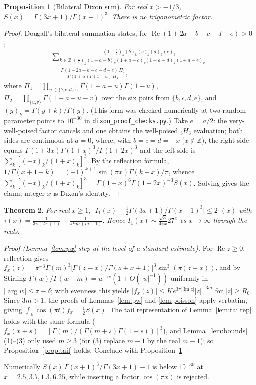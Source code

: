 \documentclass[11pt]{amsart}
\newtheorem{theorem}{Theorem}[section]
\newtheorem{proposition}[theorem]{Proposition}
\theoremstyle{remark}
\newcommand{\R}{\mathbb{R}}
\newcommand{\Z}{\mathbb{Z}}
\begin{document}
\begin{proposition}[Bilateral Dixon sum]\label{prop:bilateral}
For real $x>-1/3$, $S(x)=\Gamma(3x+1)/\Gamma(x+1)^3$. There is no trigonometric factor.
\end{proposition}
\begin{proof}
Dougall's bilateral summation \cite{Dougall,Bailey,AAR} states, for $\operatorname{Re}(1+2a-b-c-d-e)>0$,
\begin{multline*}
\sum_{k\in\Z}\frac{(1+\frac a2)_k(b)_k(c)_k(d)_k(e)_k}{(\frac a2)_k(1+a-b)_k(1+a-c)_k(1+a-d)_k(1+a-e)_k}\\
=\frac{\Gamma(1+2a-b-c-d-e)\,\Pi_1}{\Gamma(1+a)\Gamma(1-a)\,\Pi_2},
\end{multline*}
where $\Pi_1=\prod_{u\in\{b,c,d,e\}}\Gamma(1+a-u)\Gamma(1-u)$, $\Pi_2=\prod_{\{u,v\}}\Gamma(1+a-u-v)$ over the six pairs from $\{b,c,d,e\}$, and $(y)_k=\Gamma(y+k)/\Gamma(y)$. (This form was checked numerically at two random parameter
points to $10^{-30}$ in \texttt{dixon\_proof\_checks.py}.) Take $e=a/2$: the very-well-poised factor cancels and one obtains the
well-poised ${}_3H_3$ evaluation; both sides are continuous at $a=0$, where, with $b=c=d=-x$ ($x\notin\Z$), the right side equals
$\Gamma(1+3x)\Gamma(1+x)^3/\Gamma(1+2x)^3$ and the left side is $\sum_k[(-x)_k/(1+x)_k]^3$.
By the reflection formula, $1/\Gamma(x+1-k)=(-1)^{k+1}\sin(\pi x)\Gamma(k-x)/\pi$, whence
$\sum_k[(-x)_k/(1+x)_k]^3=\Gamma(1+x)^6\Gamma(1+2x)^{-3}S(x)$. Solving gives the claim; integer $x$ is Dixon's identity.
\end{proof}

\begin{theorem}\label{thm:real}
For real $x\ge1$, $\bigl|I_1(x)-\frac12\Gamma(3x+1)/\Gamma(x+1)^3\bigr|\le2\tau(x)$ with
$\tau(x)=\frac{1}{3\psi(2x+1)}+\frac1{\pi^3m^2(m-1)}$. Hence $I_1(x)\sim\frac{\sqrt3}{4\pi x}27^x$ as $x\to\infty$ through the reals.
\end{theorem}
\begin{proof}[Proof (Lemma~\ref{lem:pw} step at the level of a standard estimate)]
For $\operatorname{Re}z\ge0$, reflection gives $f_x(z)=\pi^{-3}\Gamma(m)^3\bigl[\Gamma(z-x)/\Gamma(z+x+1)\bigr]^3\sin^3(\pi(z-x))$, and by Stirling
$\Gamma(w)/\Gamma(w+m)=w^{-m}(1+O(|w|^{-1}))$ uniformly in $|\arg w|\le\pi-\delta$; with evenness this yields
$|f_x(z)|\le K e^{3\pi|\operatorname{Im}z|}|z|^{-3m}$ for $|z|\ge R_0$. Since $3m>1$, the proofs of Lemmas~\ref{lem:pw} and \ref{lem:poisson}
apply verbatim, giving $\int_\R\cos(\pi t)f_x=\frac12S(x)$. The tail representation of Lemma~\ref{lem:tailrep} holds with the same formula
($f_x(x+s)=[\Gamma(m)/(\Gamma(m+s)\Gamma(1-s))]^3$), and Lemma~\ref{lem:bounds}(1)--(3) only used $m\ge3$ (for (3) replace $m-1$ by the real $m-1$);
so Proposition~\ref{prop:tail} holds. Conclude with Proposition~\ref{prop:bilateral}.
\end{proof}
Numerically $S(x)\,\Gamma(x+1)^3/\Gamma(3x+1)-1$ is below $10^{-30}$ at $x=2.5,3.7,1.3,6.25$, while inserting a factor $\cos(\pi x)$ is rejected.
\end{document}
